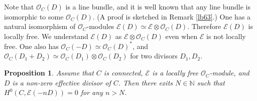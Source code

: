 \documentclass[12pt,b5paper,notitlepage]{report}
\theoremstyle{definition}
\theoremstyle{plain}
\newtheorem{pp}[df]{Proposition}
\newcommand{\scr}{\mathscr}
\numberwithin{equation}{section}
\begin{document}
Note that $\scr O_C(D)$ is a line bundle, and it is well known that any line bundle is isomorphic to some $\scr O_C(D)$. (A proof is sketched in Remark \ref{lb63}.) One has a natural isomorphism of $\scr O_C$-modules $\scr E(D)\simeq\scr E\otimes\scr O_C(D)$.  Therefore $\scr E(D)$ is locally free. We understand $\scr E(D)$ as $\scr E\otimes\scr O_C(D)$ even when $\scr E$ is not locally free. One also has $\scr O_C(-D)\simeq\scr O_C(D)^*$, and $\scr O_C(D_1+D_2)\simeq\scr O_C(D_1)\otimes\scr O_C(D_2)$ for two divisors $D_1,D_2$.



\begin{pp}\label{lb62}
Assume that $C$ is connected, $\scr E$ is a locally free $\scr O_C$-module, and  $D$ is a non-zero effective divisor of $C$. Then   there exits $N\in\mathbb N$ such that $H^0(C,\scr E(-nD))=0$ for any $n> N$.
\end{pp}
\end{document}
